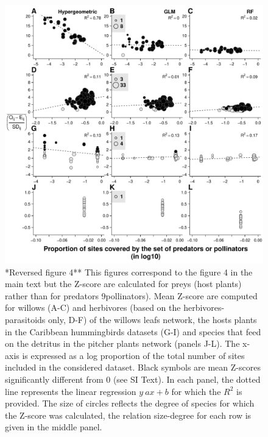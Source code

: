 \begin{figure}[htbp]
\centering
\includegraphics{chapitre3/figS8.pdf}
\caption{*Reversed figure 4** This figures correspond to the figure 4 in
the main text but the Z-score are calculated for preys (host plants)
rather than for predators 9pollinators). Mean Z-score are computed for
willows (A-C) and herbivores (based on the herbivores-parasitoids only,
D-F) of the willows leafs network, the hosts plants in the Caribbean
hummingbirds datasets (G-I) and species that feed on the detritus in the
pitcher plants network (panels J-L). The x-axis is expressed as a log
proportion of the total number of sites included in the considered
dataset. Black symbols are mean Z-scores significantly different from 0
(see SI Text). In each panel, the dotted line represents the linear
regression \(y~ax+b\) for which the \(R^2\) is provided. The size of
circles reflects the degree of species for which the Z-score was
calculated, the relation size-degree for each row is given in the middle
panel.\label{fig:degocc2}}
\end{figure}

\newpage

